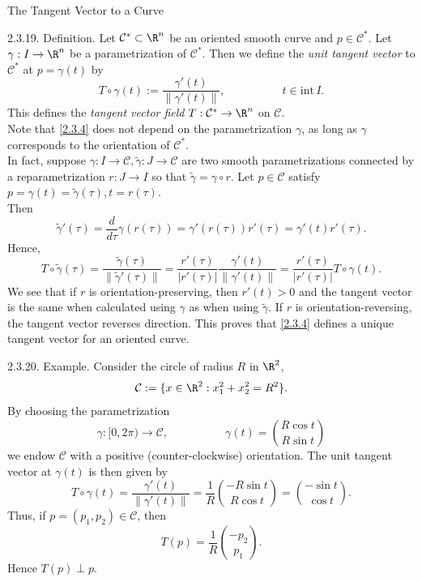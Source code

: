 \documentclass[smaller,hyperref={CJKbookmarks=true}]{beamer}
\begin{document}
\begin{frame}{The Tangent Vector to a Curve}
\begin{spacing}{1.05}
\alert{2.3.19. Definition.} Let $\mathcal{C}^*\subset\R^n$ be an oriented smooth curve and $p\in\mathcal{C}^*$. Let $\gamma:I\to\R^n$ be a parametrization of $\mathcal{C}^*$. Then we define the \emph{unit tangent vector} to $\mathcal{C}^*$ at $p=\gamma(t)$ by
\begin{equation}\label{2.3.4}
  T\circ\gamma(t):=\frac{\gamma'(t)}{\|\gamma'(t)\|},
  \qquad\qquad\quad t\in\text{int}\,I.
\end{equation}
This defines the \emph{tangent vector field} $T:\mathcal{C}^*\to\R^n$ on $\mathcal{C}$.\\[5pt]
Note that \eqref{2.3.4} does not depend on the parametrization $\gamma$, as long as $\gamma$ corresponds to the orientation of $\mathcal{C}^*$.\\[5pt]
In fact, suppose $\gamma:I\to\mathcal{C},\widetilde{\gamma}:J\to
\mathcal{C}$ are two smooth parametrizations connected by a reparametrization $r:J\to I$ so that $\widetilde{\gamma}=\gamma\circ r$. Let $p\in\mathcal{C}$ satisfy $p=\gamma(t)=\widetilde{\gamma}(\tau),t=r(\tau)$.\\
Then
\[\widetilde{\gamma}'(\tau)=\frac{d}{d\tau}\gamma(r(\tau))=\gamma'(r(\tau))r'(\tau)=\gamma'(t)r'(\tau).\]
\newpage
Hence,
\begin{equation}\label{2.3.5}
T\circ\widetilde{\gamma}(\tau)=\frac{\widetilde{\gamma}(\tau)}{\|\widetilde{\gamma}'(\tau)\|}=\frac{r'(\tau)}{|r'(\tau)|}
\frac{\gamma'(t)}{\|\gamma'(t)\|}=\frac{r'(\tau)}{|r'(\tau)|}T\circ\gamma(t).
\end{equation}
We see that if $r$ is orientation-preserving, then $r'(t)>0$ and the tangent vector
is the same when calculated using $\gamma$ as when using $\widetilde{\gamma}$. If $r$ is
orientation-reversing, the tangent vector reverses direction. This proves that \eqref{2.3.4} defines a unique tangent vector for an oriented curve.
\end{spacing}
\newpage
\begin{spacing}{0.6}
\alert{2.3.20. Example.} Consider the circle of radius $R$ in $\R^2$,
\[\mathcal{C}:=\{x\in\R^2:x_1^2+x_2^2=R^2\}.\]
By choosing the parametrization
\[\gamma:[0,2\pi)\to\mathcal{C},\qquad\qquad\quad
\gamma(t)=\binom{R\cos t}{R\sin t}\]
we endow $\mathcal{C}$ with a positive (counter-clockwise) orientation. The unit
tangent vector at $\gamma(t)$ is then given by
\[T\circ\gamma(t)=\frac{\gamma'(t)}{\|\gamma'(t)\|}=\frac{1}{R}
\binom{-R\sin t}{R\cos t}=\binom{-\sin t}{\cos t}.\]
Thus, if $p=(p_1,p_2)\in\mathcal{C}$, then
\[T(p)=\frac{1}{R}\binom{-p_2}{p_1}.\]
Hence $T(p)\perp p$.
\end{spacing}
\end{frame}
\end{document}
